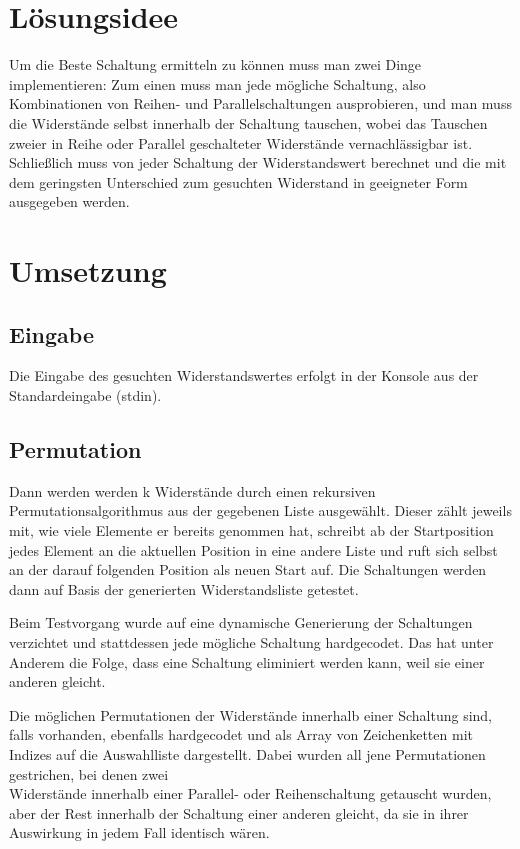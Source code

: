 \documentclass[a4paper,10pt,ngerman]{scrartcl}
\title{\Aufgabe}
\author{\Name\\Team-ID: \TeamId}
\date{\today}
\begin{document}
\maketitle
\vspace{7\baselineskip}
\tableofcontents
\pagebreak

\section{Lösungsidee}
\vspace{1\baselineskip}
Um die Beste Schaltung ermitteln zu können muss man zwei Dinge implementieren: Zum einen muss man jede mögliche Schaltung, also Kombinationen von Reihen- und Parallelschaltungen ausprobieren, und man muss die Widerstände selbst innerhalb der Schaltung tauschen, wobei das Tauschen zweier in Reihe oder Parallel geschalteter Widerstände vernachlässigbar ist. Schließlich muss von jeder Schaltung der Widerstandswert berechnet und die mit dem geringsten Unterschied zum gesuchten Widerstand in geeigneter Form ausgegeben werden.


\pagebreak
\section{Umsetzung}
\subsection{Eingabe}
Die Eingabe des gesuchten Widerstandswertes erfolgt in der Konsole aus der Standardeingabe (stdin).

\subsection{Permutation}
Dann werden werden k Widerstände durch einen rekursiven Permutationsalgorithmus aus der gegebenen Liste ausgewählt. Dieser zählt jeweils mit, wie viele Elemente er bereits genommen hat, schreibt ab der Startposition jedes Element an die aktuellen Position in eine andere Liste und ruft sich selbst an der darauf folgenden Position als neuen Start auf. Die Schaltungen werden dann auf Basis der generierten Widerstandsliste getestet.

Beim Testvorgang wurde auf eine dynamische Generierung der Schaltungen verzichtet und stattdessen jede mögliche Schaltung hardgecodet. Das hat unter Anderem die Folge, dass eine Schaltung eliminiert werden kann, weil sie einer anderen gleicht.

Die möglichen Permutationen der Widerstände innerhalb einer Schaltung sind, falls vorhanden, ebenfalls hardgecodet und als Array von Zeichenketten mit Indizes auf die Auswahlliste dargestellt. Dabei wurden all jene Permutationen gestrichen, bei denen zwei \\ Widerstände innerhalb einer Parallel- oder Reihenschaltung getauscht wurden, aber der Rest innerhalb der Schaltung einer anderen gleicht, da sie in ihrer Auswirkung in jedem Fall identisch wären.
\end{document}
